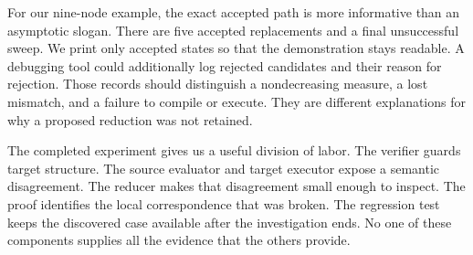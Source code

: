 For our nine-node example, the exact accepted path is more informative than an asymptotic slogan.
There are five accepted replacements and a final unsuccessful sweep.
We print only accepted states so that the demonstration stays readable.
A debugging tool could additionally log rejected candidates and their reason for rejection.
Those records should distinguish a nondecreasing measure, a lost mismatch, and a failure to compile or execute.
They are different explanations for why a proposed reduction was not retained.

The completed experiment gives us a useful division of labor.
The verifier guards target structure.
The source evaluator and target executor expose a semantic disagreement.
The reducer makes that disagreement small enough to inspect.
The proof identifies the local correspondence that was broken.
The regression test keeps the discovered case available after the investigation ends.
No one of these components supplies all the evidence that the others provide.
